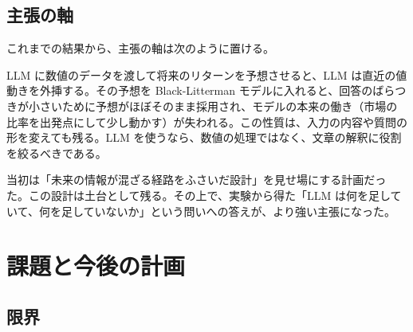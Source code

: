 \documentclass[xelatex,ja=standard,jafont=hiragino-pron,a4paper,10pt]{bxjsreport}
\begin{document}
\section{主張の軸}

これまでの結果から、主張の軸は次のように置ける。

\begin{keybox}[主張]
LLM に数値のデータを渡して将来のリターンを予想させると、LLM は直近の値動きを外挿する。その予想を Black-Litterman モデルに入れると、回答のばらつきが小さいために予想がほぼそのまま採用され、モデルの本来の働き（市場の比率を出発点にして少し動かす）が失われる。この性質は、入力の内容や質問の形を変えても残る。LLM を使うなら、数値の処理ではなく、文章の解釈に役割を絞るべきである。
\end{keybox}

当初は「未来の情報が混ざる経路をふさいだ設計」を見せ場にする計画だった。この設計は土台として残る。その上で、実験から得た「LLM は何を足していて、何を足していないか」という問いへの答えが、より強い主張になった。

\chapter{課題と今後の計画}\label{ch:future}

\section{限界}\label{sec:limits}
\end{document}

